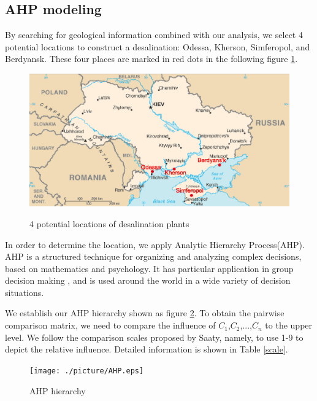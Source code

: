 \subsection{AHP modeling}
By searching for geological information combined with our analysis, we select 4 potential locations to construct a desalination: Odessa, Kherson, Simferopol, and Berdyansk. These four places are marked in red dots in the following figure \ref{location}.
\begin{figure}[!htbp]
  \centering
  \includegraphics[width=12cm]{./picture/location.eps}\\
  \caption{4 potential locations of desalination plants}\label{location}
\end{figure}
In order to determine the location, we apply Analytic Hierarchy Process(AHP)\cite{Qiyuan}. AHP is a structured technique for organizing and analyzing complex decisions, based on mathematics and psychology. It has particular application in group decision making \cite{Qiyuan}, and is used around the world in a wide variety of decision situations.

We establish our AHP hierarchy shown as figure \ref{AHP}. To obtain the pairwise comparison matrix, we need to compare the influence of $C_1$,$C_2$,...,$C_n$ to the upper level. We follow the comparison scales proposed by Saaty, namely, to use 1-9 to depict the relative influence. Detailed information is shown in Table \ref{scale}.
\begin{figure}[!htbp]
  \centering
  \texttt{[image: ./picture/AHP.eps]}\\
  \caption{AHP hierarchy}\label{AHP}
\end{figure}

